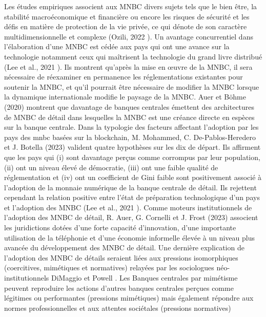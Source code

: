 \documentclass[12pt]{article}
\begin{document}
Les études empiriques associent aux MNBC divers sujets tels que le bien être, la stabilité macroéconomique et financière ou encore les risques de sécurité et les défis en matière de protection de la vie privée, ce qui dénote de son caractère multidimensionnelle et complexe (Ozili, 2022 \cite{Ozili2022Central}). Un avantage concurrentiel dans l'élaboration d'une MNBC est cédée aux pays qui ont une avance sur la technologie notamment ceux qui maîtrisent la technologie du grand livre distribué (Lee et al., 2021 \cite{chuen_global_2021}). Ils montrent qu'après la mise en œuvre de la MNBC, il sera nécessaire de réexaminer en permanence les réglementations existantes pour soutenir la MNBC, et qu'il pourrait être nécessaire de modifier la MNBC lorsque la dynamique internationale modifie le paysage de la MNBC. Auer et Böhme (2020) \cite{RePEc:bis:bisqtr:2003j} montrent que davantage de banques centrales émettent des architectures de MNBC de détail dans lesquelles la MNBC est une créance directe en espèces sur la banque centrale. Dans la typologie des facteurs affectant l'adoption par les pays des mnbc basées sur la blockchain, M. Mohammed, C. De-Pablos-Heredero et J. Botella (2023) \cite{Mohammed2023Exploring} valident quatre hypothèses sur les dix de départ. Ils affirment que les pays qui (i) sont davantage perçus comme corrompus par leur population, (ii) ont un niveau élevé de démocratie, (iii) ont une faible qualité de réglementation et (iv) ont un coefficient de Gini faible sont positivement associé à l'adoption de la monnaie numérique de la banque centrale de détail. Ils rejettent cependant la relation positive entre l'état de préparation technologique d'un pays et l'adoption des MNBC (Lee et al., 2021 \cite{chuen_global_2021}). Comme moteurs institutionnels de l'adoption des MNBC de détail, R. Auer, G. Cornelli et J. Frost (2023) \cite{013f4a37-bc65-3840-b210-0ecaf970d07c} associent les juridictions dotées d’une forte capacité d’innovation, d'une importante utilisation de la téléphonie et d'une économie informelle élevée à un niveau plus avancée du développement des MNBC de détail. Une dernière explication de l'adoption des MNBC de détails seraient liées aux pressions isomorphiques (coercitives, mimétiques et normatives) relayées par les sociologues néo-institutionnels DiMaggio et Powell \cite{powell2012new}. Les Banques centrales par mimétisme peuvent reproduire les actions d'autres banques centrales perçues comme légitimes ou performantes (pressions mimétiques) mais également répondre aux normes professionnelles et aux attentes sociétales (pressions normatives)\\
\end{document}
